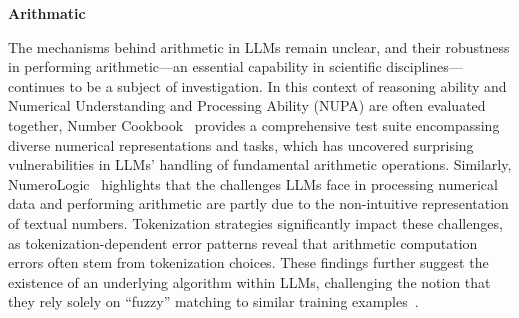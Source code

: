 {%


\textbf{Arithmatic}

The mechanisms behind arithmetic in LLMs remain unclear, and their robustness in performing arithmetic—an essential capability in scientific disciplines—continues to be a subject of investigation. In this context of reasoning ability and Numerical Understanding and Processing Ability (NUPA) are often evaluated together, Number Cookbook~\cite{yang2024number} provides a comprehensive test suite encompassing diverse numerical representations and tasks, which has uncovered surprising vulnerabilities in LLMs' handling of fundamental arithmetic operations. Similarly, NumeroLogic~\cite{schwartz2024numerologic} highlights that the challenges LLMs face in processing numerical data and performing arithmetic are partly due to the non-intuitive representation of textual numbers. Tokenization strategies significantly impact these challenges, as tokenization-dependent error patterns reveal that arithmetic computation errors often stem from tokenization choices. These findings further suggest the existence of an underlying algorithm within LLMs, challenging the notion that they rely solely on “fuzzy” matching to similar training examples~\cite{singh2024tokenization}.
}
\fi







\iffalse
\begin{itemize}
    \item The emergence of reasoning model: xxx
    \item CLIMATE Perdiction models
    \item CLIMAQA / ClimateGPT: Text definition benchmarj
    \item Reasoning model bench: AIME2024 (Math) Math Reasoning and GPQA(Science): A Graduate-Level Google-Proof Q\&A Benchmark
    \item Science + Numerical Value Variation: + Structural Variation: MM-PhyQA: Multimodal Physics Question-Answering  With Multi-Image CoT Prompting
    \item SCIBENCH: Evaluating College-Level Scientific Problem-Solving Abilities of  Large Language Models: that no single prompting strategy significantly outperforms the others and some strategies that demonstrate improvements in certain problem-solving skills could result in declines in other skills.
    \item: The Impact of Reasoning Step Length on Large Language Models: Reasoning step is important in Cot prompt
\end{itemize}
\fi